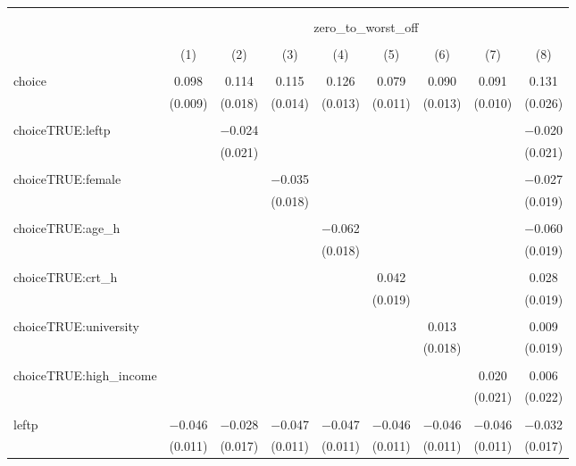 
\begin{table}[!htbp] \centering 
  \caption{} 
  \label{} 
\begin{tabular}{@{\extracolsep{5pt}}lcccccccc} 
\\[-1.8ex]\hline 
\hline \\[-1.8ex] 
\\[-1.8ex] & \multicolumn{8}{c}{zero\_to\_worst\_off} \\ 
\\[-1.8ex] & (1) & (2) & (3) & (4) & (5) & (6) & (7) & (8)\\ 
\hline \\[-1.8ex] 
 choice & 0.098 & 0.114 & 0.115 & 0.126 & 0.079 & 0.090 & 0.091 & 0.131 \\ 
  & (0.009) & (0.018) & (0.014) & (0.013) & (0.011) & (0.013) & (0.010) & (0.026) \\ 
  & & & & & & & & \\ 
 choiceTRUE:leftp &  & $-$0.024 &  &  &  &  &  & $-$0.020 \\ 
  &  & (0.021) &  &  &  &  &  & (0.021) \\ 
  & & & & & & & & \\ 
 choiceTRUE:female &  &  & $-$0.035 &  &  &  &  & $-$0.027 \\ 
  &  &  & (0.018) &  &  &  &  & (0.019) \\ 
  & & & & & & & & \\ 
 choiceTRUE:age\_h &  &  &  & $-$0.062 &  &  &  & $-$0.060 \\ 
  &  &  &  & (0.018) &  &  &  & (0.019) \\ 
  & & & & & & & & \\ 
 choiceTRUE:crt\_h &  &  &  &  & 0.042 &  &  & 0.028 \\ 
  &  &  &  &  & (0.019) &  &  & (0.019) \\ 
  & & & & & & & & \\ 
 choiceTRUE:university &  &  &  &  &  & 0.013 &  & 0.009 \\ 
  &  &  &  &  &  & (0.018) &  & (0.019) \\ 
  & & & & & & & & \\ 
 choiceTRUE:high\_income &  &  &  &  &  &  & 0.020 & 0.006 \\ 
  &  &  &  &  &  &  & (0.021) & (0.022) \\ 
  & & & & & & & & \\ 
 leftp & $-$0.046 & $-$0.028 & $-$0.047 & $-$0.047 & $-$0.046 & $-$0.046 & $-$0.046 & $-$0.032 \\ 
  & (0.011) & (0.017) & (0.011) & (0.011) & (0.011) & (0.011) & (0.011) & (0.017) \\ 

\end{tabular}
\end{table}
